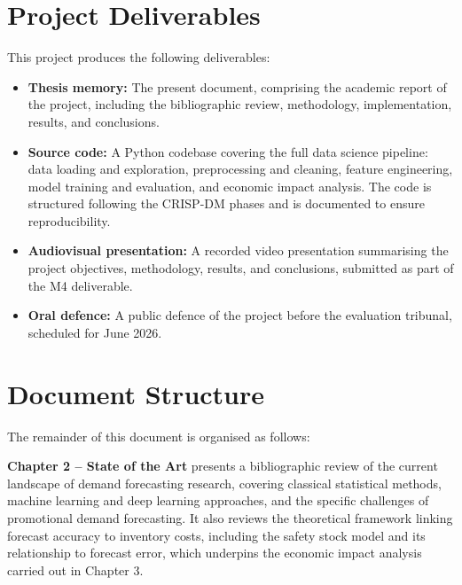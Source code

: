 \documentclass[ENG]{TFUOC}%
\begin{document}
\section{Project Deliverables}

This project produces the following deliverables:

\begin{itemize}

    \item \textbf{Thesis memory:} The present document, comprising 
    the academic report of the project, including the 
    bibliographic review, methodology, implementation, results, 
    and conclusions.

    \item \textbf{Source code:} A Python codebase covering the full data science 
    pipeline: data loading and exploration, preprocessing and 
    cleaning, feature engineering, model training and evaluation, 
    and economic impact analysis. The code is structured following 
    the CRISP-DM phases and is documented to ensure reproducibility.

    \item \textbf{Audiovisual presentation:} A recorded video 
    presentation summarising the project objectives, methodology, 
    results, and conclusions, submitted as part of the M4 
    deliverable.

    \item \textbf{Oral defence:} A public defence of the project 
    before the evaluation tribunal, scheduled for June 2026.

\end{itemize}

\section{Document Structure}

The remainder of this document is organised as follows:

\textbf{Chapter 2 -- State of the Art} presents a bibliographic 
review of the current landscape of demand forecasting research, 
covering classical statistical methods, machine learning and deep 
learning approaches, and the specific challenges of promotional 
demand forecasting. It also reviews the theoretical framework 
linking forecast accuracy to inventory costs, including the safety 
stock model and its relationship to forecast error, which 
underpins the economic impact analysis carried out in Chapter 3.
\end{document}
